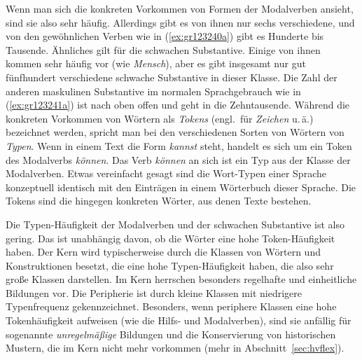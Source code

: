 Wenn man sich die konkreten Vorkommen von Formen der Modalverben ansieht, sind sie also sehr häufig.
Allerdings gibt es von ihnen nur sechs verschiedene, und von den gewöhnlichen Verben wie in (\ref{ex:gr123240a}) gibt es Hunderte bis Tausende.
Ähnliches gilt für die schwachen Substantive.
Einige von ihnen kommen sehr häufig vor (wie \textit{Mensch}), aber es gibt insgesamt nur gut fünfhundert verschiedene schwache Substantive in dieser Klasse.
Die Zahl der anderen maskulinen Substantive im normalen Sprachgebrauch wie in (\ref{ex:gr123241a}) ist nach oben offen und geht in die Zehntausende.
Während die konkreten Vorkommen von Wörtern als \textit{Tokens} (engl.\ für \textit{Zeichen} u.\,ä.) bezeichnet werden, spricht man bei den verschiedenen Sorten von Wörtern von \textit{Typen}.
Wenn in einem Text die Form \textit{kannst} steht, handelt es sich um ein Token des Modalverbs \textit{können}.
Das Verb \textit{können} an sich ist ein Typ aus der Klasse der Modalverben.
Etwas vereinfacht gesagt sind die Wort-Typen einer Sprache konzeptuell identisch mit den Einträgen in einem Wörterbuch dieser Sprache.
Die Tokens sind die hingegen konkreten Wörter, aus denen Texte bestehen.

Die Typen-Häufigkeit der Modalverben und der schwachen Substantive ist also gering.
Das ist unabhängig davon, ob die Wörter eine hohe Token-Häufigkeit haben.
Der Kern wird typischerweise durch die Klassen von Wörtern und Konstruktionen besetzt, die eine hohe Typen-Häufigkeit haben, die also sehr große Klassen darstellen.
Im Kern herrschen besonders regelhafte und einheitliche Bildungen vor.
Die Peripherie ist durch kleine Klassen mit niedrigere Typenfrequenz gekennzeichnet.
Besonders, wenn periphere Klassen eine hohe Tokenhäufigkeit aufweisen (wie die Hilfs- und Modalverben), sind sie anfällig für sogenannte \textit{unregelmäßige} Bildungen und die Konservierung von historischen Mustern, die im Kern nicht mehr vorkommen (mehr in Abschnitt~\ref{sec:hvflex}).


